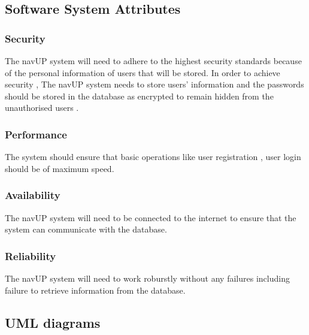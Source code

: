 \subsection{Software System Attributes}

	\subsubsection{Security}
	The navUP system will need to adhere to the highest security standards because of the personal information of users that will be stored. In order to achieve security , The navUP system needs to store users’ information and the passwords should be stored in the database as encrypted to remain hidden from the unauthorised users  .
	\subsubsection{Performance}
	The system should ensure that basic operations like user registration , user login should be of maximum speed. 
	\subsubsection{Availability}
	The navUP system will need to be connected to the internet to ensure that the system can communicate with  the database.
	\subsubsection{Reliability}
	The navUP system will need to work roburstly without any failures including failure to retrieve information from the database.

\subsection{UML diagrams}
